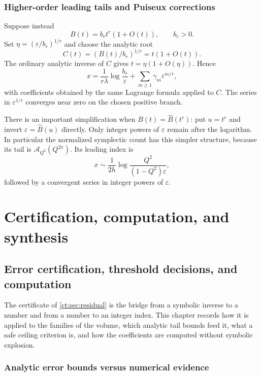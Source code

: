 \documentclass[11pt,openany]{book}
\numberwithin{equation}{chapter}
\theoremstyle{plain}
\theoremstyle{definition}
\theoremstyle{remark}
\newcommand{\eps}{\varepsilon}
\begin{document}
\section{Higher-order leading tails and Puiseux corrections}

Suppose instead
\[
 B(t)=b_rt^r(1+O(t)),\qquad b_r>0.
\]
Set $\eta=(\eps/b_r)^{1/r}$ and choose the analytic root
\[
 C(t)=\left(B(t)/b_r\right)^{1/r}=t(1+O(t)).
\]
The ordinary analytic inverse of $C$ gives $t=\eta(1+O(\eta))$. Hence
\begin{equation}\label{t3:eq:puiseux-endpoint}
 x=\frac1{r\lambda}\log\frac{b_r}{\eps}
       +\sum_{m\ge1}\gamma_m\eps^{m/r},
\end{equation}
with coefficients obtained by the same Lagrange formula applied to $C$. The series in $\eps^{1/r}$ converges near zero on the chosen positive branch.

There is an important simplification when $B(t)=\widehat B(t^r)$: put $u=t^r$ and invert $\eps=\widehat B(u)$ directly. Only integer powers of $\eps$ remain after the logarithm. In particular the normalized symplectic count has this simpler structure, because its tail is $\mathcal A_{Q^2}(Q^{2x})$. Its leading index is
\[
 x\sim\frac1{2h}\log\frac{Q^2}{(1-Q^2)\eps},
\]
followed by a convergent series in integer powers of $\eps$.

\part{Certification, computation, and synthesis}
\label{ct:part:certification}

\chapter{Error certification, threshold decisions, and computation}
\label{ct:ch:certification}

The certificate of \cref{ct:sec:residual} is the bridge from a symbolic
inverse to a number and from a number to an integer index.  This chapter
records how it is applied to the families of the volume, which analytic
tail bounds feed it, what a safe ceiling criterion is, and how the
coefficients are computed without symbolic explosion.

\label{t3:sec:certification}

\section{Analytic error bounds versus numerical evidence}
\end{document}
